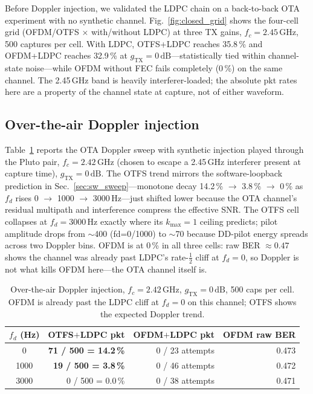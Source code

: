 \documentclass[conference,10pt]{IEEEtran}
\newcommand{\fd}{f_d}
\newcommand{\kmax}{k_{\max}}
\newcommand{\dB}{\ensuremath{\,\mathrm{dB}}}
\newcommand{\Hz}{\ensuremath{\,\mathrm{Hz}}}
\begin{document}
Before Doppler injection, we validated the LDPC chain on a back-to-back OTA experiment with no synthetic channel. Fig.~\ref{fig:closed_grid} shows the four-cell grid (OFDM/OTFS $\times$ with/without LDPC) at three TX gains, $f_c = 2.45\,\mathrm{GHz}$, 500 captures per cell. With LDPC, OTFS+LDPC reaches 35.8\,\% and OFDM+LDPC reaches 32.9\,\% at $g_{\mathrm{TX}}{=}0\dB$---statistically tied within channel-state noise---while OFDM without FEC fails completely (0\,\%) on the same channel. The 2.45\,GHz band is heavily interferer-loaded; the absolute pkt rates here are a property of the channel state at capture, not of either waveform.

\subsection{Over-the-air Doppler injection}
\label{sec:ota_doppler}

Table~\ref{tab:ota_doppler} reports the OTA Doppler sweep with synthetic injection played through the Pluto pair, $f_c = 2.42\,\mathrm{GHz}$ (chosen to escape a 2.45\,GHz interferer present at capture time), $g_{\mathrm{TX}} = 0\dB$. The OTFS trend mirrors the software-loopback prediction in Sec.~\ref{sec:sw_sweep}---monotone decay 14.2\,\% $\to$ 3.8\,\% $\to$ 0\,\% as $\fd$ rises 0 $\to$ 1000 $\to$ 3000\Hz---just shifted lower because the OTA channel's residual multipath and interference compress the effective SNR. The OTFS cell collapses at $\fd = 3000\Hz$ exactly where its $\kmax{=}1$ ceiling predicts; pilot amplitude drops from $\sim$400 (fd=0/1000) to $\sim$70 because DD-pilot energy spreads across two Doppler bins. OFDM is at 0\,\% in all three cells: raw BER $\approx 0.47$ shows the channel was already past LDPC's rate-$\tfrac{1}{2}$ cliff at $\fd = 0$, so Doppler is not what kills OFDM here---the OTA channel itself is.

\begin{table}[!t]
  \centering
  \caption{Over-the-air Doppler injection, $f_c{=}2.42\,\mathrm{GHz}$, $g_{\mathrm{TX}}{=}0\dB$, 500 caps per cell. OFDM is already past the LDPC cliff at $\fd{=}0$ on this channel; OTFS shows the expected Doppler trend.}
  \label{tab:ota_doppler}
  \footnotesize
  \begin{tabular}{c r r r}
    \toprule
    $\fd$ (Hz) & OTFS$+$LDPC pkt & OFDM$+$LDPC pkt & OFDM raw BER \\
    \midrule
    0     & \textbf{71 / 500 = 14.2\,\%}  & 0 / 23 attempts & 0.473 \\
    1000  & \textbf{19 / 500 =  3.8\,\%}  & 0 / 46 attempts & 0.472 \\
    3000  & 0 / 500 =  0.0\,\%  & 0 / 38 attempts & 0.471 \\
    \bottomrule
  \end{tabular}
\end{table}
\end{document}
